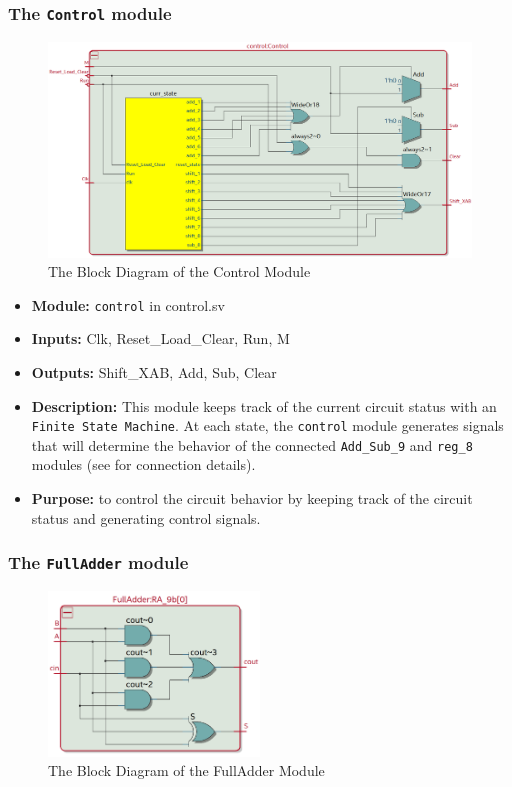 \documentclass{article}
\begin{document}
\subsubsection{The \texttt{Control} module}
\begin{figure}[h]
    \centering
    \includegraphics[width=\textwidth]{control.png}
    \caption{The Block Diagram of the Control Module}
    \label{fig:control}
\end{figure}

\begin{itemize}
    \item \textbf{Module:} \texttt{control} in control.sv
    \item \textbf{Inputs:} Clk, Reset\_Load\_Clear, Run, M
    \item \textbf{Outputs:} Shift\_XAB, Add, Sub, Clear
    \item \textbf{Description:} This module keeps track of the current circuit status with an \texttt{Finite State Machine}. At each state, the \texttt{control} module generates signals that will determine the behavior of the connected \texttt{Add\_Sub\_9} and \texttt{reg\_8} modules (see  for connection details). 
    \item \textbf{Purpose:} to control the circuit behavior by keeping track of the circuit status and generating control signals.
\end{itemize}


\subsubsection{The \texttt{FullAdder} module}
\begin{figure}[h]
    \centering
    \includegraphics[width=0.5\textwidth]{full_adder.png}
    \caption{The Block Diagram of the FullAdder Module}
    \label{fig:full_adder}
\end{figure}
\end{document}
